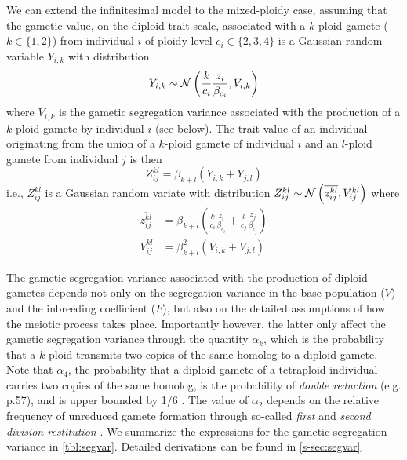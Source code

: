 \documentclass[12pt,a4paper]{article}
\begin{document}
    We can extend the infinitesimal model to the mixed-ploidy case, assuming that the
    gametic value, on the diploid trait scale, associated with a $k$-ploid gamete ($k
    \in \{1,2\}$) from individual $i$ of ploidy level $c_i \in \{2,3,4\}$ is a
    Gaussian random variable $Y_{i,k}$ with distribution
    \begin{equation}
        Y_{i,k} \sim \mathcal{N}\left(\frac{k}{c_i}\frac{z_i}{\beta_{c_i}}, V_{i,k}\right)
        \label{eq:gamete}
    \end{equation}
    where $V_{i,k}$ is the gametic segregation variance associated with the
    production of a $k$-ploid gamete by individual $i$ (see below).
    The trait value of an individual originating from the union of a $k$-ploid
    gamete of individual $i$ and an $l$-ploid gamete from individual $j$ is then
      $$Z_{ij}^{kl} = \beta_{k+l}\left(Y_{i,k} + Y_{j,l}\right)$$
    i.e., $Z_{ij}^{kl}$ is a Gaussian random variate with distribution
        $Z_{ij}^{kl} \sim \mathcal{N}\left(\overline{z_{ij}^{kl}},
        V_{ij}^{kl}\right)$
    where
    \begin{align}
        \overline{z_{ij}^{kl}} &= \beta_{k+l} \left(
              \frac{k}{c_i}\frac{z_i}{\beta_{c_i}} 
            + \frac{l}{c_j}\frac{z_j}{\beta_{c_j}}\right) \nonumber \\
        V_{ij}^{kl} &= \beta_{k+l}^2 (V_{i,k} + V_{j,l})
       \label{eq:oneline}
    \end{align}

    The gametic segregation variance associated with the production of diploid
    gametes depends not only on the segregation variance in the base population
    ($V$) and the inbreeding coefficient ($F$), but also on the detailed
    assumptions of how the meiotic process takes place.
    Importantly however, the latter only affect the gametic segregation variance
    through the quantity $\alpha_k$, which is the probability that a $k$-ploid
    transmits two copies of the same homolog to a diploid gamete.
    Note that $\alpha_4$, the probability that a diploid gamete of a tetraploid
    individual carries two copies of the same homolog, is the probability of
    \textit{double reduction} (e.g. \cite{lynch1998} p.57), and is upper bounded by
    1/6 \citep{stift2008}.
    The value of $\alpha_2$ depends on the relative frequency of unreduced gamete
    formation through so-called \textit{first} and \textit{second division
    restitution} \citep{bretagnolle1995,storme2013}.
    We summarize the expressions for the gametic segregation variance in
    \cref{tbl:segvar}.
    Detailed derivations can be found in \cref{s-sec:segvar}.
\end{document}
